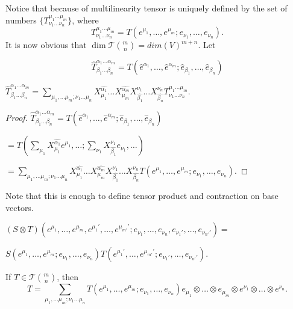 \documentclass[main.tex]{subfiles}
\begin{document}
Notice that because of multilinearity tensor is uniquely defined by the set of numbers $\{T^{\mu_1\dots\mu_m}_{\nu_1\dots\nu_n}\}$, where
\begin{equation}
\label{ten_coef}
T^{\mu_1\dots\mu_m}_{\nu_1\dots\nu_n} = T(e^{\mu_1}, \dots, e^{\mu_m}; e_{\nu_1}, \dots, e_{\nu_n}).
\end{equation}
It is now obvious that $\dim\mathcal{T}\binom{m}{n} = dim(V)^{m + n}$. 
Let

\begin{equation}
\hat{T}^{\alpha_1\dots\alpha_m}_{\beta_1\dots\beta_n} = T(\hat{e}^{\alpha_1}, \dots, \hat{e}^{\alpha_m}; \hat{e}_{\beta_1}, \dots,\hat{e}_{\beta_n}) 
\end{equation}

\begin{fact}
$\hat{T}^{\alpha_1\dots\alpha_m}_{\beta_1\dots\beta_n} = \sum\limits_{\mu_1,\dots\mu_m;\nu_1\dots\mu_n}X^{\hat{\alpha_1}}_{\mu_1}\dots X^{\hat{\alpha_m}}_{\mu_m}
 X^{\nu_1}_{\hat{\beta_1}}\dots X^{\nu_n}_{\hat{\beta_n}} T^{\mu_1\dots\mu_m}_{\nu_1\dots\nu_n}$.
\end{fact}
\begin{proof}
$\hat{T}^{\alpha_1\dots\alpha_m}_{\beta_1\dots\beta_n} = T(\hat{e}^{\alpha_1}, \dots, \hat{e}^{\alpha_m}; \hat{e}_{\beta_1}, \dots,\hat{e}_{\beta_n})$

$ = T(\sum_{\mu_1} X^{\hat{\alpha_1}}_{\mu_1} e^{\mu_1}, \dots; \sum_{\nu_1} X^{\nu_1}_{\hat{\beta_1}} e_{\nu_1}, \dots)$

$=\sum\limits_{\mu_1,\dots\mu_m;\nu_1\dots\mu_n}X^{\hat{\alpha_1}}_{\mu_1}\dots X^{\hat{\alpha_m}}_{\mu_m}
 X^{\nu_1}_{\hat{\beta_1}}\dots X^{\nu_n}_{\hat{\beta_n}} T(e^{\mu_1}, \dots, e^{\mu_m}; e_{\nu_1}, \dots, e_{\nu_n}).$
\end{proof}

Note that this is enough to define tensor product and contraction on base vectors.
\begin{definition}
$(S\otimes T)(e^{\mu_1}, \dots, e^{\mu_m}, e^{\mu_1'}, \dots, e^{\mu_{m'}'};e_{\nu_1}, \dots, e_{\nu_n}, e_{\nu_1'}, \dots, e_{\nu_{n'}'}) = $

$S(e^{\mu_1}, \dots, e^{\mu_m};e_{\nu_1}, \dots, e_{\nu_n})T(e^{\mu_1'}, \dots, e^{\mu_{m'}'};e_{\nu_1'}, \dots, e_{\nu_{n'}'}).$
\end{definition}

\begin{corollary} If $T\in\mathcal{T}\binom{m}{n}$, then
\begin{equation}
T = \sum\limits_{\mu_1,\dots\mu_m;\nu_1\dots\mu_n} T(e^{\mu_1}, \dots, e^{\mu_m}; e_{\nu_1}, \dots, e_{\nu_n}) e_{\mu_1} \otimes \dots \otimes e_{\mu_m} \otimes e^{\nu_1} \otimes \dots \otimes e^{\nu_n}.
\end{equation}
\end{corollary}
\end{document}
